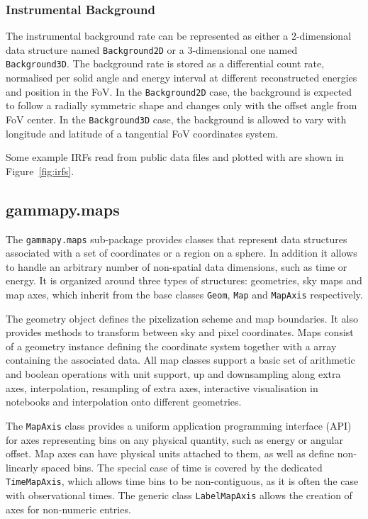 \documentclass[longauth]{aa}
\newcommand{\code}[1]{\texttt{#1}}
\begin{document}
\subsubsection{Instrumental Background}
The instrumental background rate can be represented as either a 2-dimensional
data structure named \code{Background2D} or a 3-dimensional one named \code{Background3D}.
The background rate is stored as a differential count rate, normalised per solid angle
and energy interval at different reconstructed energies and position in the FoV.
In the \code{Background2D} case, the background is expected to follow a radially symmetric shape
and changes only with the offset angle from FoV center.
In the \code{Background3D} case, the background is allowed to vary with 
longitude and latitude of a tangential FoV coordinates system.

Some example IRFs read from public data files and plotted with \gammapy are shown 
in Figure~\ref{fig:irfs}.

\subsection{gammapy.maps}
\label{ssec:gammapy-maps}
The \code{gammapy.maps} sub-package provides classes that represent data
structures associated with a set of coordinates or a region on a sphere. In
addition it allows to handle an arbitrary number of non-spatial data
dimensions, such as time or energy. It is organized around three types of
structures: geometries, sky maps and map axes, which inherit from the base
classes \code{Geom}, \code{Map} and \code{MapAxis} respectively.

The geometry object defines the pixelization scheme and map boundaries. It also
provides methods to transform between sky and pixel coordinates. Maps consist
of a geometry instance defining the coordinate system together with a
\numpy array containing the associated data. All map classes support a basic
set of arithmetic and boolean operations with  unit support, up and downsampling
along extra axes, interpolation, resampling of extra axes, interactive visualisation
in notebooks and interpolation onto different geometries.

The \code{MapAxis} class provides a uniform application programming interface
(API) for axes representing
bins on any physical quantity, such as energy or angular offset.
Map axes can have physical units attached to them, as well as define
non-linearly spaced bins. The special case of time is covered by the
dedicated \code{TimeMapAxis}, which allows time bins to be non-contiguous,
as it is often the case with observational times. The generic
class \code{LabelMapAxis} allows the creation of axes for non-numeric entries.
\end{document}
